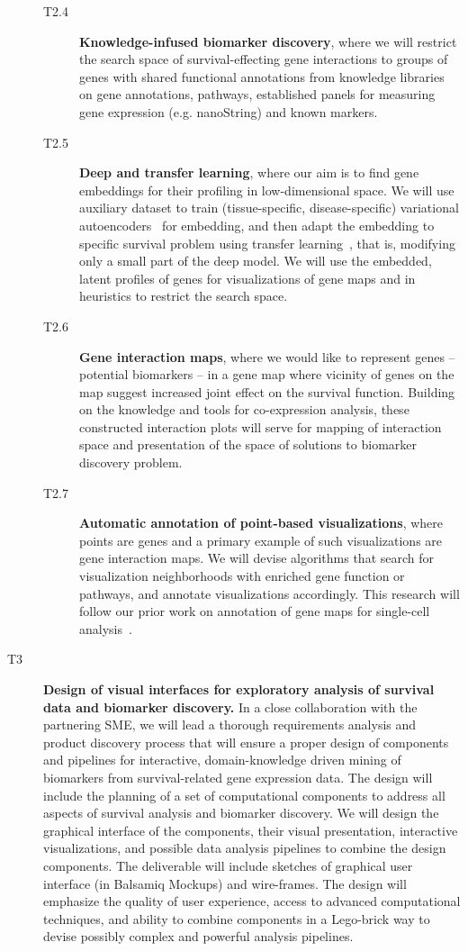 \documentclass[11pt,a4paper]{article}
\renewcommand{\bold}{\textbf}
\begin{document}
\begin{description}
\begin{description}
		\item[T2.4] \bold{Knowledge-infused biomarker discovery}, where we will restrict the search space of survival-effecting gene interactions to groups of genes with shared functional annotations from knowledge libraries on gene annotations, pathways, established panels for measuring gene expression (e.g. nanoString) and known markers.
		\item[T2.5] \bold{Deep and transfer learning}, where our aim is to find gene embeddings for their profiling in low-dimensional space. We will use auxiliary dataset to train (tissue-specific, disease-specific) variational autoencoders~\cite{} for embedding, and then adapt the embedding to specific survival problem using transfer learning~\cite{}, that is, modifying only a small part of the deep model. We will use the embedded, latent profiles of genes for visualizations of gene maps and in heuristics to restrict the search space.
		\item[T2.6] \bold{Gene interaction maps}, where we would like to represent genes -- potential biomarkers -- in a gene map where vicinity of genes on the map suggest increased joint effect on the survival function. Building on the knowledge and tools for co-expression analysis, these constructed interaction plots will serve for mapping of interaction space and presentation of the space of solutions to biomarker discovery problem.
		\item[T2.7] \bold{Automatic annotation of point-based visualizations}, where points are genes and a primary example of such visualizations are gene interaction maps. We will devise algorithms that search for visualization neighborhoods with enriched gene function or pathways, and annotate visualizations accordingly. This research will follow our prior work on annotation of gene maps for single-cell analysis~\cite{}.
	\end{description}
	\item[T3] \bold{Design of visual interfaces for exploratory analysis of survival data and biomarker discovery.} In a close collaboration with the partnering SME, we will lead a thorough requirements analysis and product discovery process that will ensure a proper design of components and pipelines for interactive, domain-knowledge driven mining of biomarkers from survival-related gene expression data. The design will include the planning of a set of computational components to address all aspects of survival analysis and biomarker discovery. We will design the graphical interface of the components, their visual presentation, interactive visualizations, and possible data analysis pipelines to combine the design components. The deliverable will include sketches of graphical user interface (in Balsamiq Mockups) and wire-frames. The design will emphasize the quality of user experience, access to advanced computational techniques, and ability to combine components in a Lego-brick way to devise possibly complex and powerful analysis pipelines.

\end{description}
\end{document}
